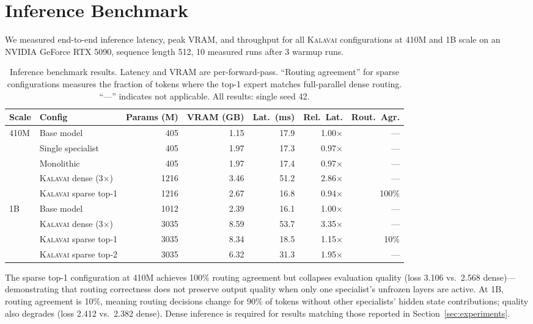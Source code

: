 \documentclass{article}
\newcommand{\kalavai}{\textsc{Kalavai}\xspace}
\begin{document}
\section{Inference Benchmark}
\label{app:inference}

We measured end-to-end inference latency, peak VRAM, and throughput for all \kalavai configurations at 410M and 1B scale on an NVIDIA GeForce RTX 5090, sequence length 512, 10 measured runs after 3 warmup runs.

\begin{table}[h]
\centering
\caption{Inference benchmark results. Latency and VRAM are per-forward-pass. ``Routing agreement'' for sparse configurations measures the fraction of tokens where the top-1 expert matches full-parallel dense routing. ``---'' indicates not applicable. All results: single seed 42.}
\label{tab:inferencebench}
\small
\begin{tabular}{llrrrrr}
\toprule
\textbf{Scale} & \textbf{Config} & \textbf{Params (M)} & \textbf{VRAM (GB)} & \textbf{Lat.\ (ms)} & \textbf{Rel.\ Lat.} & \textbf{Rout.\ Agr.} \\
\midrule
\multirow{5}{*}{410M}
 & Base model          & 405  & 1.15 & 17.9 & 1.00$\times$ & --- \\
 & Single specialist   & 405  & 1.97 & 17.3 & 0.97$\times$ & --- \\
 & Monolithic          & 405  & 1.97 & 17.4 & 0.97$\times$ & --- \\
 & \kalavai dense (3$\times$) & 1216 & 3.46 & 51.2 & 2.86$\times$ & --- \\
 & \kalavai sparse top-1 & 1216 & 2.67 & 16.8 & 0.94$\times$ & 100\% \\
\midrule
\multirow{4}{*}{1B}
 & Base model          & 1012 & 2.39 & 16.1 & 1.00$\times$ & --- \\
 & \kalavai dense (3$\times$) & 3035 & 8.59 & 53.7 & 3.35$\times$ & --- \\
 & \kalavai sparse top-1 & 3035 & 8.34 & 18.5 & 1.15$\times$ & 10\% \\
 & \kalavai sparse top-2 & 3035 & 6.32 & 31.3 & 1.95$\times$ & --- \\
\bottomrule
\end{tabular}
\end{table}

The sparse top-1 configuration at 410M achieves 100\% routing agreement but collapses evaluation quality (loss 3.106 vs.\ 2.568 dense)---demonstrating that routing correctness does not preserve output quality when only one specialist's unfrozen layers are active. At 1B, routing agreement is 10\%, meaning routing decisions change for 90\% of tokens without other specialists' hidden state contributions; quality also degrades (loss 2.412 vs.\ 2.382 dense). Dense inference is required for results matching those reported in Section~\ref{sec:experiments}.
\end{document}
